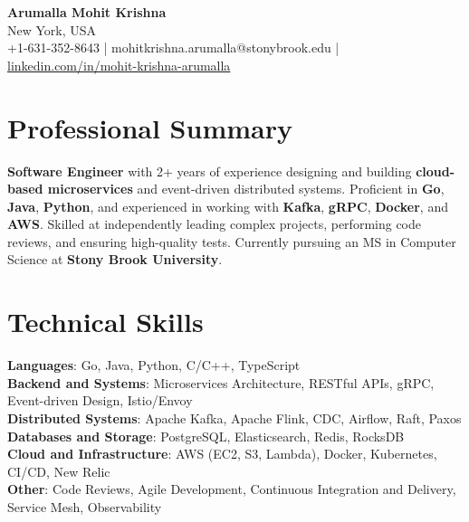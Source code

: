 \documentclass[letterpaper,11pt]{article}
\begin{document}
\begin{center}
  {\Large \textbf{Arumalla Mohit Krishna}} \\
  New York, USA \\
  +1-631-352-8643 \enspace | \enspace mohitkrishna.arumalla@stonybrook.edu \enspace | \enspace \href{https://www.linkedin.com/in/mohit-krishna-arumalla}{linkedin.com/in/mohit-krishna-arumalla}
\end{center}

\section{Professional Summary}
  \begin{itemize}[leftmargin=0.15in, label={}]
    \small{\item{
     \textbf{Software Engineer} with 2+ years of experience designing and building \textbf{cloud-based microservices} and event-driven distributed systems. Proficient in \textbf{Go}, \textbf{Java}, \textbf{Python}, and experienced in working with \textbf{Kafka}, \textbf{gRPC}, \textbf{Docker}, and \textbf{AWS}. Skilled at independently leading complex projects, performing code reviews, and ensuring high-quality tests. Currently pursuing an MS in Computer Science at \textbf{Stony Brook University}.
    }}
  \end{itemize}
\vspace{-16pt}

\section{Technical Skills}
 \begin{itemize}[leftmargin=0.15in, label={}]
    \small{\item{
     \textbf{Languages}: Go, Java, Python, C/C++, TypeScript \\
     \textbf{Backend and Systems}: Microservices Architecture, RESTful APIs, gRPC, Event-driven Design, Istio/Envoy \\
     \textbf{Distributed Systems}: Apache Kafka, Apache Flink, CDC, Airflow, Raft, Paxos \\
     \textbf{Databases and Storage}: PostgreSQL, Elasticsearch, Redis, RocksDB \\
     \textbf{Cloud and Infrastructure}: AWS (EC2, S3, Lambda), Docker, Kubernetes, CI/CD, New Relic \\
     \textbf{Other}: Code Reviews, Agile Development, Continuous Integration and Delivery, Service Mesh, Observability
    }}
 \end{itemize}
\vspace{-16pt}
\end{document}
